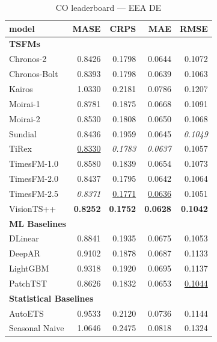 \begin{table}[H]
\caption{CO leaderboard --- EEA DE}
\centering
\begin{small}
\begin{tabular}{lrrrr}
\toprule
model & MASE & CRPS & MAE & RMSE \\
\midrule
\multicolumn{5}{l}{\textbf{TSFMs}} \\
Chronos-2 & 0.8426 & 0.1798 & 0.0644 & 0.1072 \\
Chronos-Bolt & 0.8393 & 0.1798 & 0.0639 & 0.1063 \\
Kairos & 1.0330 & 0.2181 & 0.0786 & 0.1207 \\
Moirai-1 & 0.8781 & 0.1875 & 0.0668 & 0.1091 \\
Moirai-2 & 0.8530 & 0.1808 & 0.0650 & 0.1068 \\
Sundial & 0.8436 & 0.1959 & 0.0645 & \textit{0.1049} \\
TiRex & \underline{0.8330} & \textit{0.1783} & \textit{0.0637} & 0.1057 \\
TimesFM-1.0 & 0.8580 & 0.1839 & 0.0654 & 0.1073 \\
TimesFM-2.0 & 0.8437 & 0.1795 & 0.0642 & 0.1064 \\
TimesFM-2.5 & \textit{0.8371} & \underline{0.1771} & \underline{0.0636} & 0.1051 \\
VisionTS++ & \textbf{0.8252} & \textbf{0.1752} & \textbf{0.0628} & \textbf{0.1042} \\
\midrule
\multicolumn{5}{l}{\textbf{ML Baselines}} \\
DLinear & 0.8841 & 0.1935 & 0.0675 & 0.1053 \\
DeepAR & 0.9102 & 0.1878 & 0.0687 & 0.1133 \\
LightGBM & 0.9318 & 0.1920 & 0.0695 & 0.1137 \\
PatchTST & 0.8626 & 0.1832 & 0.0653 & \underline{0.1044} \\
\midrule
\multicolumn{5}{l}{\textbf{Statistical Baselines}} \\
AutoETS & 0.9533 & 0.2120 & 0.0736 & 0.1144 \\
Seasonal Naive & 1.0646 & 0.2475 & 0.0818 & 0.1324 \\
\bottomrule
\end{tabular}
\end{small}
\end{table}